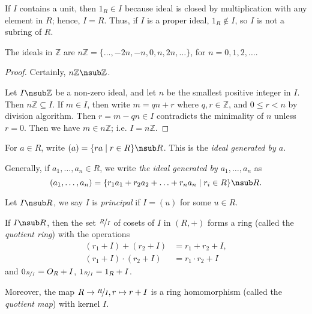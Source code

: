\begin{remark}
    If \(I\) contains a unit, then \(1_R \in I\) because ideal is closed by multiplication with any element in \(R\); hence, \(I=R\). Thus, if \(I\) is a proper ideal, \(1_R \notin I\), so \(I\) is not a subring of \(R\).
\end{remark}
\begin{lemma}
    The ideals in \(\mathbb{Z}\) are \(n\mathbb{Z} = \{\ldots,-2n, -n, 0, n, 2n, \ldots\}\), for \(n = 0, 1, 2, \ldots\).
\end{lemma}
\begin{proof}
    Certainly, \(n\mathbb{Z} \nsub \mathbb{Z}\).

    Let \(I \nsub \mathbb{Z}\) be a non-zero ideal, and let \(n\) be the smallest positive integer in \(I\). Then \(n\mathbb{Z} \subseteq I\). If \(m \in I\), then write \(m = qn + r\) where \(q, r\in \mathbb{Z}\), and \(0\leq r < n\) by division algorithm. Then \(r = m - qn \in I\) contradicts the minimality of \(n\) unless \(r = 0\). Then we have \(m \in n\mathbb{Z}\); i.e. \(I = n\mathbb{Z}\).
\end{proof}
\begin{definition}
    For \(a \in R\), write \((a) = \{ra\mid r\in R\} \nsub R\). This is the \textit{ideal generated by \(a\)}.

    Generally, if \(a_1, \ldots, a_n \in R\), we write \textit{the ideal generated by \(a_1, \ldots, a_n\)} as
    \[
        (a_1, \ldots, a_n) = \{r_{1}a_1 + r_2 a_2 + \ldots + r_n a_n \mid r_i \in R\} \nsub R.
    \]
\end{definition}
\begin{definition}
    Let \(I \nsub R\), we say \(I\) is \textit{principal} if \(I = (u)\) for some \(u \in R\).
\end{definition}
\begin{theorem}
    If \(I \nsub R\), then the set \(\nicefrac{R}{I}\) of cosets of \(I\) in \((R, +)\) forms a ring (called the \textit{quotient ring}) with the operations
    \begin{align*}
        (r_1 + I) + (r_2 + I) &= r_1 + r_2 + I,\\
        (r_1 + I) \cdot (r_2 + I) &= r_1 \cdot r_2 + I
    \end{align*}
    and \(0_{\nicefrac{R}{I}} = O_R + I\), \(1_{\nicefrac{R}{I}} = 1_R + I\).

    Moreover, the map \(R \to \nicefrac{R}{I}, r \mapsto r + I\) is a ring homomorphism (called the \textit{quotient map}) with kernel \(I\).
\end{theorem}
